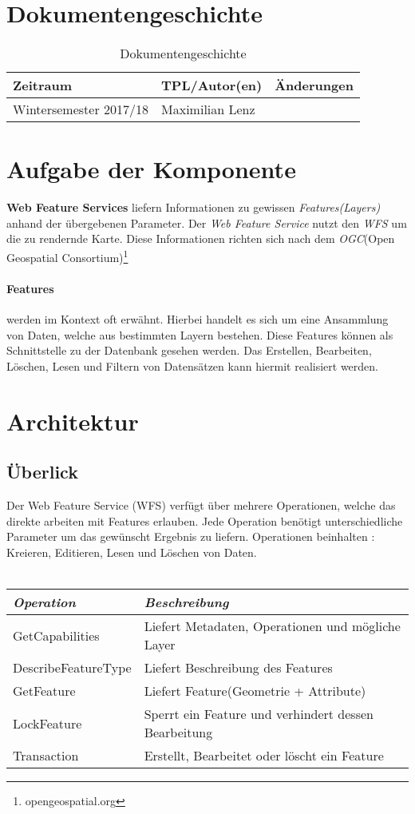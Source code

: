 \section{Dokumentengeschichte}
\begin{table}[h]
 \begin{tabular}{|l|l|l|}
 \hline
 Zeitraum & TPL/Autor(en) & Änderungen \\
 \hline
 Wintersemester 2017/18 & Maximilian Lenz & 
  \\
 \hline
 \end{tabular}
 \caption{Dokumentengeschichte}
 \end{table}

\section{Aufgabe der Komponente}
\textbf{Web Feature Services} liefern Informationen zu gewissen \emph{Features(Layers)} anhand der \"ubergebenen Parameter. Der \emph{Web Feature Service} nutzt den \emph{WFS} um die zu rendernde Karte. Diese Informationen richten sich nach dem \emph{OGC}(Open Geospatial Consortium)\footnote{opengeospatial.org}

\paragraph*{Features} werden im Kontext oft erwähnt. Hierbei handelt es sich um eine Ansammlung von Daten, welche aus bestimmten Layern bestehen. Diese Features können als Schnittstelle zu der Datenbank gesehen werden. Das Erstellen, Bearbeiten, Löschen, Lesen und Filtern von Datensätzen kann hiermit realisiert werden.
 

\section{Architektur}
\subsection{\"Uberlick}
Der Web Feature Service (WFS) verfügt über mehrere Operationen, welche das direkte arbeiten mit Features erlauben. Jede Operation benötigt unterschiedliche Parameter um das gewünscht Ergebnis zu liefern. Operationen beinhalten : Kreieren, Editieren, Lesen und Löschen von Daten.\\
\vspace{1em}\\
\begin{tabular}{ll}
\emph{Operation} & \emph{Beschreibung} \\
\hline 
GetCapabilities & Liefert Metadaten, Operationen und m\"ogliche Layer \\ 
\hline 
DescribeFeatureType & Liefert Beschreibung des Features \\ 
\hline 
GetFeature & Liefert Feature(Geometrie + Attribute)\\ 
\hline 
LockFeature & Sperrt ein Feature und verhindert dessen Bearbeitung\\
\hline 
Transaction & Erstellt, Bearbeitet oder löscht ein Feature\\ 
\hline 
\end{tabular} 
